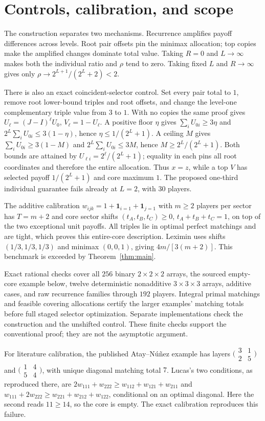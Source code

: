 \documentclass[11pt]{article}
\begin{document}
\section{Controls, calibration, and scope}
The construction separates two mechanisms. Recurrence amplifies payoff
differences across levels. Root pair offsets pin the minimax allocation;
top copies make the amplified changes dominate total value. Taking $R=0$
and $L\to\infty$ makes both the individual ratio and $\rho$ tend to zero.
Taking fixed $L$ and $R\to\infty$ gives only
$\rho\to2^{L+1}/(2^L+2)<2$.

There is also an exact coincident-selector control. Set every pair total to
$1$, remove root lower-bound triples and root offsets, and change the
level-one complementary triple value from $3$ to $1$. With no copies the
same proof gives $U_\ell=(J-I)^\ell U_0$, $V_\ell=1-U_\ell$.
A positive floor $\eta$ gives $\sum_iU_{0i}\ge3\eta$ and
$2^L\sum_iU_{0i}\le3(1-\eta)$, hence $\eta\le1/(2^L+1)$.
A ceiling $M$ gives $\sum_iU_{0i}\ge3(1-M)$ and
$2^L\sum_iU_{0i}\le3M$, hence $M\ge2^L/(2^L+1)$.
Both bounds are attained by $U_{\ell i}=2^\ell/(2^L+1)$; equality in
each pins all root coordinates and therefore the entire allocation.
Thus $x=z$, while a top $V$ has selected payoff
$1/(2^L+1)$ and core maximum $1$. The proposed one-third individual
guarantee fails already at $L=2$, with $30$ players.

The additive calibration $w_{ijk}=1+\mathbf1_{i=1}+\mathbf1_{j=1}$ with
$m\ge2$ players per sector has $T=m+2$ and core sector shifts
$(t_A,t_B,t_C)\ge0$, $t_A+t_B+t_C=1$, on top of the two exceptional
unit payoffs. All triples lie in optimal perfect matchings and are tight,
which proves this entire-core description. Leximin uses shifts
$(1/3,1/3,1/3)$ and minimax $(0,0,1)$, giving $4m/[3(m+2)]$.
This benchmark is exceeded by Theorem~\ref{thm:main}.

Exact rational checks cover all $256$ binary $2\times2\times2$ arrays,
the sourced empty-core example below, twelve deterministic nonadditive
$3\times3\times3$ arrays, additive cases, and raw recurrence families through
$192$ players. Integral primal matchings and feasible covering allocations
certify the larger examples' matching totals before full staged selector
optimization. Separate implementations check the construction and the
unshifted control. These finite checks support the conventional proof;
they are not the asymptotic argument.

For literature calibration, the published Atay--N\'u\~nez example has layers
$\bigl(\begin{smallmatrix}3&1\\2&5\end{smallmatrix}\bigr)$ and
$\bigl(\begin{smallmatrix}1&4\\5&4\end{smallmatrix}\bigr)$, with unique
diagonal matching total $7$. Lucas's two conditions, as reproduced there,
are $2w_{111}+w_{222}\ge w_{112}+w_{121}+w_{211}$ and
$w_{111}+2w_{222}\ge w_{221}+w_{212}+w_{122}$, conditional on an optimal
diagonal. Here the second reads $11\ge14$, so the core is empty.
The exact calibration reproduces this failure.
\end{document}
